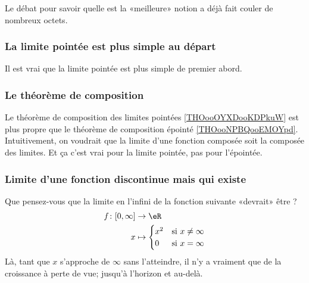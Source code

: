 Le débat pour savoir quelle est la «meilleure» notion a déjà fait couler de nombreux octets\cite{BIBooKNWHooBRoxme,BIBooNUKAooVMqppa,BIBooDILKooUcmUVD,BIBooJDPPooVONaQV,BIBooUIAFooHqKjQh}.


\subsubsection{La limite pointée est plus simple au départ}

Il est vrai que la limite pointée est plus simple de premier abord.

\subsubsection{Le théorème de composition}

Le théorème de composition des limites pointées \ref{THOooOYXDooKDPkuW} est plus propre que le théorème de composition épointé \ref{THOooNPBQooEMOYpd}. Intuitivement, on voudrait que la limite d'une fonction composée soit la composée des limites. Et ça c'est vrai pour la limite pointée, pas pour l'épointée.

\subsubsection{Limite d'une fonction discontinue mais qui existe}

Que pensez-vous que la limite en l'infini de la fonction suivante «devrait» être ?
\begin{equation}
	\begin{aligned}
		f\colon \mathopen[ 0 , \infty \mathclose] & \to \eR                               \\
		x                                         & \mapsto \begin{cases}
			                                                    x^2 & \text{si } x\neq \infty \\
			                                                    0   & \text{si }x=\infty
		                                                    \end{cases}
	\end{aligned}
\end{equation}
Là, tant que \( x\) s'approche de \( \infty\) sans l'atteindre, il n'y a vraiment que de la croissance à perte de vue; jusqu'à l'horizon et au-delà.

